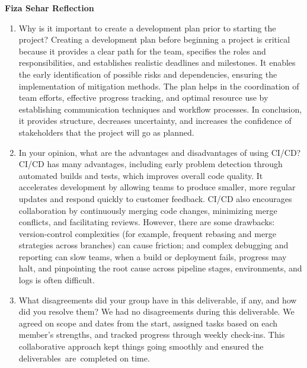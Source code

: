 \documentclass{article}
\begin{document}
\textbf{Fiza Sehar Reflection}
\begin{enumerate}
    \item Why is it important to create a development plan prior to starting the
    project?
    Creating a development plan before beginning a project is critical because it provides a clear path for the team, specifies the roles and responsibilities, and establishes realistic deadlines and milestones.  It enables the early identification of possible risks and dependencies, ensuring the implementation of mitigation methods.  The plan helps in the coordination of team efforts, effective progress tracking, and optimal resource use by establishing communication techniques and workflow processes.  In conclusion, it provides structure, decreases uncertainty, and increases the confidence of stakeholders that the project will go as planned.
    \item In your opinion, what are the advantages and disadvantages of using CI/CD?
    CI/CD has many advantages, including early problem detection through automated builds and tests, which improves overall code quality.  It accelerates development by allowing teams to produce smaller, more regular updates and respond quickly to customer feedback.  CI/CD also encourages collaboration by continuously merging code changes, minimizing merge conflicts, and facilitating reviews.  However, there are some drawbacks: version-control complexities (for example, frequent rebasing and merge strategies across branches) can cause friction; and complex debugging and reporting can slow teams, when a build or deployment fails, progress may halt, and pinpointing the root cause across pipeline stages, environments, and logs is often difficult.    
    \item What disagreements did your group have in this deliverable, if any,
    and how did you resolve them?
    We had no disagreements during this deliverable.  We agreed on scope and dates from the start, assigned tasks based on each member's strengths, and tracked progress through weekly check-ins.  This collaborative approach kept things going smoothly and ensured the deliverables are completed on time.
\end{enumerate}

\end{document}

